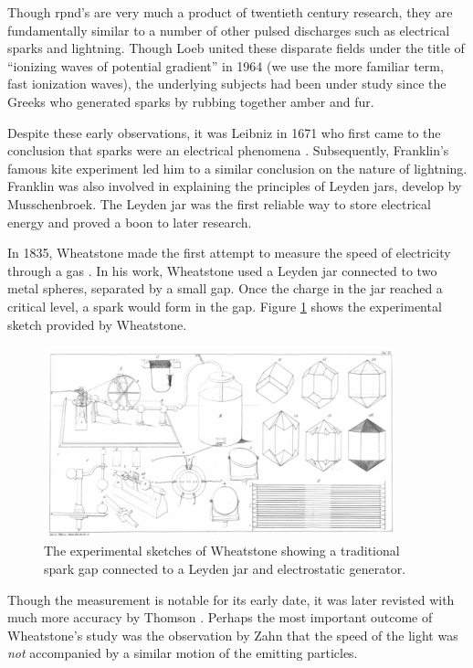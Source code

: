 Though \acs{rpnd}'s are very much a product of twentieth century research, they
are fundamentally similar to a number of other pulsed discharges such as
electrical sparks and lightning. Though Loeb united these disparate fields under
the title of ``ionizing waves of potential gradient'' in 1964 \cite{Loeb1965}
(we use the more familiar term, fast ionization waves), the underlying subjects
had been under study since the Greeks who generated sparks by rubbing together
amber and fur.

Despite these early observations, it was Leibniz in 1671 who first came to the
conclusion that sparks were an electrical phenomena \cite{Kryzhanovsky1989}.
Subsequently, Franklin's famous kite experiment led him to a similar conclusion
on the nature of lightning. Franklin was also involved in explaining the
principles of Leyden jars, develop by Musschenbroek. The Leyden jar was the
first reliable way to store electrical energy and proved a boon to later
research.

In 1835, Wheatstone made the first attempt to measure the speed of electricity
through a gas \cite{Wheatstone1835}. In his work, Wheatstone used a Leyden jar
connected to two metal spheres, separated by a small gap. Once the charge in the
jar reached a critical level, a spark would form in the gap. Figure
\ref{fig:wheatstone} shows the experimental sketch provided by Wheatstone.
\begin{figure}
  \centering
  \includegraphics[width=4in]{chapters/introduction/figures/wheatstone.png}
  \caption{The experimental sketches of Wheatstone showing a traditional
  spark gap connected to a Leyden jar and electrostatic
generator.}\label{fig:wheatstone}
\end{figure}
Though the measurement is notable for its early date, it was later revisted with
much more accuracy by Thomson \cite{Thomson1893}. Perhaps the most important
outcome of Wheatstone's study was the observation by Zahn \cite{Zahn1879} that
the speed of the light was \emph{not} accompanied by a similar motion of the
emitting particles.

